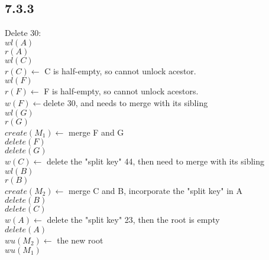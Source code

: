 \documentclass[12pt]{article}
\begin{document}
	\subsection*{7.3.3}
	Delete 30:\\
	$wl(A)$\\
	$r(A)$\\
	$wl(C)$ \\
	$r(C)\leftarrow$ C is half-empty, so cannot unlock acestor.\\
	$wl(F)$ \\
	$r(F)\leftarrow$ F is half-empty, so cannot unlock acestors.\\
	$w(F)\leftarrow$delete 30, and needs to merge with its sibling\\
	$wl(G)$\\
	$r(G)$\\
	$create(M_1)\leftarrow$ merge F and G\\
	$delete(F)$\\
	$delete(G)$\\
	$w(C)\leftarrow$ delete the "split key" 44, then need to merge with its sibling\\
	$wl(B)$\\
	$r(B)$\\
	$create(M_2)\leftarrow$ merge C and B, incorporate the "split key" in A\\
	$delete(B)$\\
	$delete(C)$\\
	$w(A)\leftarrow$ delete the "split key" 23, then the root is empty\\
	$delete(A)$\\
	$wu(M_2)\leftarrow$ the new root\\
	$wu(M_1)$\\
	
\end{document}
